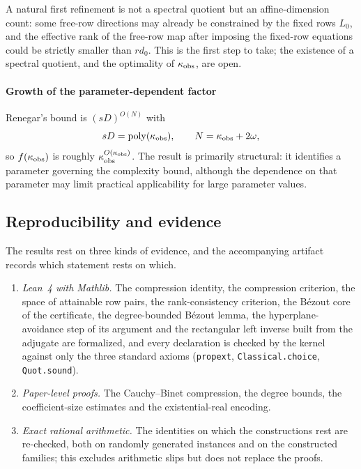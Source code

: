 A natural first refinement is not a spectral quotient but an affine-dimension count: some free-row directions may already be constrained by the fixed rows $L_0$, and the effective rank of the free-row map after imposing the fixed-row equations could be strictly smaller than $rd_0$. This is the first step to take; the existence of a spectral quotient, and the optimality of $\kappa_{\rm obs}$, are open.

\paragraph*{Growth of the parameter-dependent factor}
Renegar's bound is $(sD)^{O(N)}$ with
\begin{equation*}
sD=\operatorname{poly}(\kappa_{\rm obs}),\qquad N=\kappa_{\rm obs}+2\omega,
\end{equation*}
so $f(\kappa_{\rm obs})$ is roughly $\kappa_{\rm obs}^{O(\kappa_{\rm obs})}$. The result is primarily structural: it identifies a parameter governing the complexity bound, although the dependence on that parameter may limit practical applicability for large parameter values.

\subsection{Reproducibility and evidence}\label{sec:repro}

The results rest on three kinds of evidence, and the accompanying artifact records which statement rests on which.

\begin{enumerate}
\item \emph{Lean~4 with Mathlib.} The compression identity, the compression criterion, the space of attainable row pairs, the rank-consistency criterion, the B\'ezout core of the certificate, the degree-bounded B\'ezout lemma, the hyperplane-avoidance step of its argument and the rectangular left inverse built from the adjugate are formalized, and every declaration is checked by the kernel against only the three standard axioms (\texttt{propext}, \texttt{Classical.choice}, \texttt{Quot.sound}).
\item \emph{Paper-level proofs.} The Cauchy--Binet compression, the degree bounds, the coefficient-size estimates and the existential-real encoding.
\item \emph{Exact rational arithmetic.} The identities on which the constructions rest are re-checked, both on randomly generated instances and on the constructed families; this excludes arithmetic slips but does not replace the proofs.
\end{enumerate}


